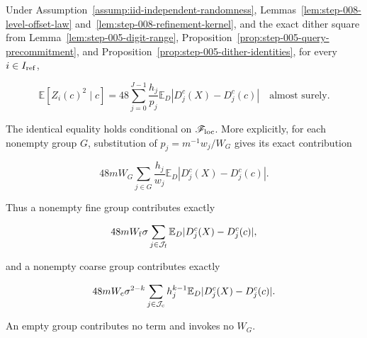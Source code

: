 \begin{proposition}\label{prop:step-008-raw-square}
Under Assumption~\ref{assump:iid-independent-randomness}, Lemmas~\ref{lem:step-008-level-offset-law} and~\ref{lem:step-008-refinement-kernel}, and the exact dither square from Lemma~\ref{lem:step-005-digit-range}, Proposition~\ref{prop:step-005-query-precommitment}, and Proposition~\ref{prop:step-005-dither-identities}, for every \(i\in I_{\rm ref}\),

\[
\boxed{
\mathbb E[Z_i(c)^2\mid c]
=48\sum_{j=0}^{J-1}\frac{h_j}{p_j}
\mathbb E_D\left|D_j^c(X)-D_j^c(c)\right|
}
\quad\text{almost surely}.
\]

The identical equality holds conditional on \(\mathscr F_{\rm loc}\). More explicitly, for each nonempty group \(G\), substitution of \(p_j=m^{-1}w_j/W_G\) gives its exact contribution

\[
48mW_G\sum_{j\in G}\frac{h_j}{w_j}
\mathbb E_D|D_j^c(X)-D_j^c(c)|.
\]

Thus a nonempty fine group contributes exactly

\[
48mW_{\rm f}\sigma
\sum_{j\in\mathcal J_{\rm f}}
\mathbb E_D|D_j^c(X)-D_j^c(c)|,
\]

and a nonempty coarse group contributes exactly

\[
48mW_{\rm c}\sigma^{2-k}
\sum_{j\in\mathcal J_{\rm c}}h_j^{k-1}
\mathbb E_D|D_j^c(X)-D_j^c(c)|.
\]

An empty group contributes no term and invokes no \(W_G\).
\end{proposition}


